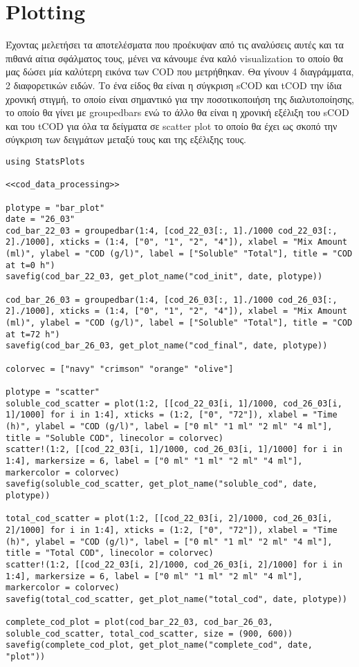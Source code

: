 \documentclass[11pt]{article}
\begin{document}
\section{Plotting}
\label{sec:org8d5b0ec}
Έχοντας μελετήσει τα αποτελέσματα που προέκυψαν από τις αναλύσεις αυτές και τα πιθανά αίτια σφάλματος τους, μένει να κάνουμε ένα καλό visualization το οποίο θα μας δώσει μία καλύτερη εικόνα των COD που μετρήθηκαν. Θα γίνουν 4 διαγράμματα, 2 διαφορετικών ειδών. Το ένα είδος θα είναι η σύγκριση sCOD και tCOD την ίδια χρονική στιγμή, το οποίο είναι σημαντικό για την ποσοτικοποιήση της διαλυτοποίησης, το οποίο θα γίνει με groupedbars ενώ το άλλο θα είναι η χρονική εξέλιξη του sCOD και του tCOD για όλα τα δείγματα σε scatter plot το οποίο θα έχει ως σκοπό την σύγκριση των δειγμάτων μεταξύ τους και της εξέλιξης τους.

\begin{verbatim}
using StatsPlots

<<cod_data_processing>>

plotype = "bar_plot"
date = "26_03"
cod_bar_22_03 = groupedbar(1:4, [cod_22_03[:, 1]./1000 cod_22_03[:, 2]./1000], xticks = (1:4, ["0", "1", "2", "4"]), xlabel = "Mix Amount (ml)", ylabel = "COD (g/l)", label = ["Soluble" "Total"], title = "COD at t=0 h")
savefig(cod_bar_22_03, get_plot_name("cod_init", date, plotype))

cod_bar_26_03 = groupedbar(1:4, [cod_26_03[:, 1]./1000 cod_26_03[:, 2]./1000], xticks = (1:4, ["0", "1", "2", "4"]), xlabel = "Mix Amount (ml)", ylabel = "COD (g/l)", label = ["Soluble" "Total"], title = "COD at t=72 h")
savefig(cod_bar_26_03, get_plot_name("cod_final", date, plotype))

colorvec = ["navy" "crimson" "orange" "olive"]

plotype = "scatter"
soluble_cod_scatter = plot(1:2, [[cod_22_03[i, 1]/1000, cod_26_03[i, 1]/1000] for i in 1:4], xticks = (1:2, ["0", "72"]), xlabel = "Time (h)", ylabel = "COD (g/l)", label = ["0 ml" "1 ml" "2 ml" "4 ml"], title = "Soluble COD", linecolor = colorvec)
scatter!(1:2, [[cod_22_03[i, 1]/1000, cod_26_03[i, 1]/1000] for i in 1:4], markersize = 6, label = ["0 ml" "1 ml" "2 ml" "4 ml"], markercolor = colorvec)
savefig(soluble_cod_scatter, get_plot_name("soluble_cod", date, plotype))

total_cod_scatter = plot(1:2, [[cod_22_03[i, 2]/1000, cod_26_03[i, 2]/1000] for i in 1:4], xticks = (1:2, ["0", "72"]), xlabel = "Time (h)", ylabel = "COD (g/l)", label = ["0 ml" "1 ml" "2 ml" "4 ml"], title = "Total COD", linecolor = colorvec)
scatter!(1:2, [[cod_22_03[i, 2]/1000, cod_26_03[i, 2]/1000] for i in 1:4], markersize = 6, label = ["0 ml" "1 ml" "2 ml" "4 ml"], markercolor = colorvec)
savefig(total_cod_scatter, get_plot_name("total_cod", date, plotype))

complete_cod_plot = plot(cod_bar_22_03, cod_bar_26_03, soluble_cod_scatter, total_cod_scatter, size = (900, 600))
savefig(complete_cod_plot, get_plot_name("complete_cod", date, "plot"))
\end{verbatim}
\end{document}

